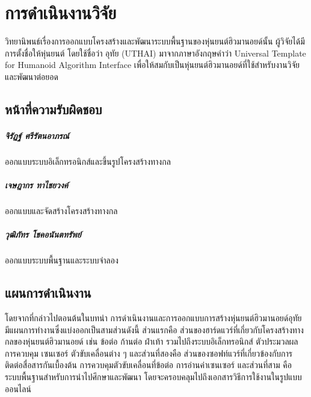 \chapter{การดำเนินงานวิจัย}
วิทยานิพนธ์เรื่องการออกแบบโครงสร้างและพัฒนาระบบพื้นฐานของหุ่นยนต์ฮิวมานอยด์นั้น ผู้วิจัยได้มีการตั้งชื่อให้หุ่นยนต์
โดยใช้ชื่อว่า อุทัย (UTHAI) มาจากภาษาอังกฤษคำว่า Universal Template for Humanoid Algorithm Interface
เพื่อให้สมกับเป็นหุ่นยนต์ฮิวมานอยด์ที่ใช้สำหรับงานวิจัยและพัฒนาต่อยอด

\vspace{3mm}
\section{หน้าที่ความรับผิดชอบ}
\paragraph*{จิรัฏฐ์ ศรีรัตนอาภรณ์}
ออกแบบระบบอิเล็กทรอนิกส์และขึ้นรูปโครงสร้างทางกล
\paragraph*{เจษฎากร ทาไชยวงค์}
ออกแบบและจัดสร้างโครงสร้างทางกล
\paragraph*{วุฒิภัทร โชคอนันตทรัพย์}
ออกแบบระบบพื้นฐานและระบบจำลอง

\vspace{3mm}
\section{แผนการดำเนินงาน}
โดยจากที่กล่าวไปตอนต้นในบทนำ
การดำเนินงานและการออกแบบการสร้างหุ่นยนต์ฮิวมานอยด์อุทัย มีแผนการทำงานซึ่งแบ่งออกเป็นสามส่วนดังนี้
ส่วนแรกคือ ส่วนของฮาร์ดแวร์ที่เกี่ยวกับโครงสร้างทางกลของหุ่นยนต์ฮิวมานอยด์ เช่น ข้อต่อ ก้านต่อ ฝ่าเท้า
รวมไปถึงระบบอิเล็กทรอนิกส์ ตัวประมวลผลการควบคุม เซนเซอร์ ตัวขับเคลื่อนต่าง ๆ และส่วนที่สองคือ
ส่วนของซอฟท์แวร์ที่เกี่ยวข้องกับการติดต่อสื่อสารกันเบื้องต้น การควบคุมตัวขับเคลื่อนที่ข้อต่อ การอ่านค่าเซนเซอร์
และส่วนที่สาม คือระบบพื้นฐานสำหรับการนำไปศึกษาและพัฒนา โดยจะครอบคลุมไปถึงเอกสารวิธีการใช้งานในรูปแบบออนไลน์

